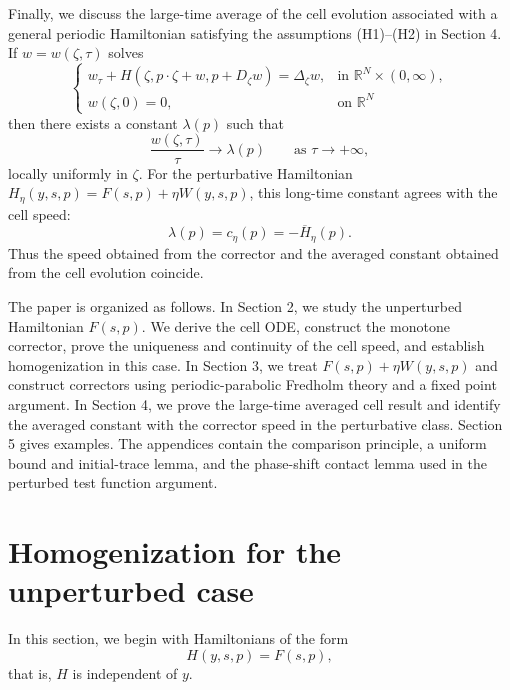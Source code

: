 \documentclass[preprint]{elsarticle}
\numberwithin{equation}{section}
\begin{document}
Finally, we discuss the large-time average of the cell evolution associated with a general periodic Hamiltonian satisfying the assumptions \textup{(H1)}--\textup{(H2)} in Section 4. If $w=w(\zeta,\tau)$ solves
\begin{equation*}
\begin{cases}
w_\tau+H(\zeta,p\cdot\zeta+w,p+D_\zeta w)=\Delta_\zeta w, &\text{in }\mathbb R^N\times(0,\infty),
\\[1mm]
w(\zeta,0)=0,&\text{on }\mathbb R^N
\end{cases}
\end{equation*}
then there exists a constant $\lambda(p)$ such that
\begin{equation*}
\frac{w(\zeta,\tau)}{\tau}\to\lambda(p)
\qquad\text{as }\tau\to+\infty,
\end{equation*}
locally uniformly in $\zeta$. For the perturbative Hamiltonian $H_\eta(y,s,p)=F(s,p)+\eta W(y,s,p)$, this long-time constant agrees with the cell speed:
\begin{equation*}
\lambda(p)=c_\eta(p)=-\overline H_\eta(p).
\end{equation*}
Thus the speed obtained from the corrector and the averaged constant obtained from the cell evolution coincide.


The paper is organized as follows. In Section 2, we study the unperturbed Hamiltonian $F(s,p)$. We derive the cell ODE, construct the monotone corrector, prove the uniqueness and continuity of the cell speed, and establish homogenization in this case. In Section 3, we treat $F(s,p)+\eta W(y,s,p)$ and construct correctors using periodic-parabolic Fredholm theory and a fixed point argument. In Section 4, we prove the large-time averaged cell result and identify the averaged constant with the corrector speed in the perturbative class. Section 5 gives examples. The appendices contain the comparison principle, a uniform bound and initial-trace lemma, and the phase-shift contact lemma used in the perturbed test function argument.

\section{Homogenization for the unperturbed case}

In this section, we begin with Hamiltonians of the form
\begin{equation}
 H(y,s,p)=F(s,p),
\end{equation}
that is, $H$ is independent of $y$.
\end{document}
